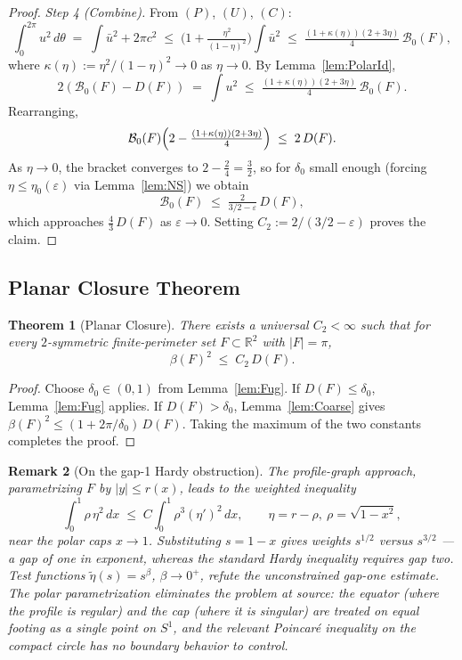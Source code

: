 \documentclass[11pt]{article}
\newtheorem{theorem}{Theorem}[section]
\newtheorem{remark}[theorem]{Remark}
\newcommand{\R}{\mathbb{R}}
\newcommand{\B}{\mathcal{B}}
\newcommand{\eps}{\varepsilon}
\begin{document}
\begin{proof}
\smallskip
\emph{Step 4 (Combine).} From $(P)$, $(U)$, $(C)$:
\[
  \int_0^{2\pi}\!u^2\,d\theta \;=\; \int\bar u^2 + 2\pi c^2 \;\le\; \bigl(1+\tfrac{\eta^2}{(1-\eta)^2}\bigr)\!\int\bar u^2 \;\le\; \tfrac{(1+\kappa(\eta))(2+3\eta)}{4}\,\B_0(F),
\]
where $\kappa(\eta):=\eta^2/(1-\eta)^2 \to 0$ as $\eta\to 0$. By Lemma~\ref{lem:PolarId},
\[
  2(\B_0(F) - D(F)) \;=\; \int u^2 \;\le\; \tfrac{(1+\kappa(\eta))(2+3\eta)}{4}\,\B_0(F).
\]
Rearranging,
\[
  \B_0(F)\Bigl(2 - \tfrac{(1+\kappa(\eta))(2+3\eta)}{4}\Bigr) \;\le\; 2\,D(F).
\]
As $\eta\to 0$, the bracket converges to $2 - \tfrac{2}{4} = \tfrac32$, so for $\delta_0$ small enough (forcing $\eta\le\eta_0(\eps)$ via Lemma~\ref{lem:NS}) we obtain
\[
  \B_0(F) \;\le\; \tfrac{2}{3/2 - \eps}\,D(F),
\]
which approaches $\tfrac{4}{3}\,D(F)$ as $\eps\to 0$. Setting $C_2 := 2/(3/2 - \eps)$ proves the claim.
\end{proof}

\subsection{Planar Closure Theorem}
\begin{theorem}[Planar Closure] \label{thm:Planar}
There exists a universal $C_2<\infty$ such that for every $2$-symmetric finite-perimeter set $F\subset\R^2$ with $|F|=\pi$,
\[ \beta(F)^2 \;\le\; C_2\,D(F). \]
\end{theorem}
\begin{proof}
Choose $\delta_0\in(0,1)$ from Lemma~\ref{lem:Fug}. If $D(F)\le\delta_0$, Lemma~\ref{lem:Fug} applies. If $D(F)>\delta_0$, Lemma~\ref{lem:Coarse} gives $\beta(F)^2 \le (1+2\pi/\delta_0)\,D(F)$. Taking the maximum of the two constants completes the proof.
\end{proof}

\begin{remark}[On the gap-1 Hardy obstruction]
The profile-graph approach, parametrizing $F$ by $|y|\le r(x)$, leads to the weighted inequality
\[
  \int_0^1 \rho\,\eta^2\,dx \;\le\; C\!\int_0^1 \rho^3 (\eta')^2\,dx, \qquad \eta=r-\rho,\ \rho=\sqrt{1-x^2},
\]
near the polar caps $x\to 1$. Substituting $s=1-x$ gives weights $s^{1/2}$ versus $s^{3/2}$ --- a \emph{gap of one} in exponent, whereas the standard Hardy inequality requires gap two. Test functions $\tilde\eta(s)=s^\beta$, $\beta\to 0^+$, refute the unconstrained gap-one estimate. The polar parametrization eliminates the problem at source: the equator (where the profile is regular) and the cap (where it is singular) are treated on equal footing as a single point on $S^1$, and the relevant Poincar\'e inequality on the compact circle has no boundary behavior to control.
\end{remark}
\end{document}
